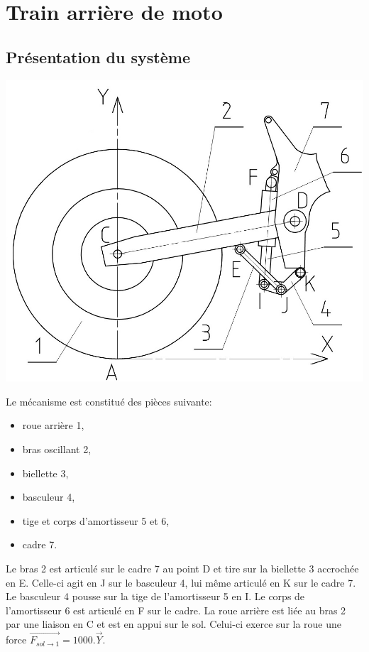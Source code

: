 

\section{Train arrière de moto}

\subsection{Présentation du système}

\begin{minipage}{0.48\linewidth}
 \centering\includegraphics[width=0.5\linewidth]{img/train_arriere_moto}
\end{minipage}
\hfill
\begin{minipage}{0.48\linewidth}
Le mécanisme est constitué des pièces suivante:
\begin{itemize}
\item roue arrière 1,
\item bras oscillant 2,
\item biellette 3,
\item basculeur 4,
\item tige et corps d'amortisseur 5 et 6,
\item cadre 7.
\end{itemize}
\end{minipage}

Le bras 2 est articulé sur le cadre 7 au point D et tire sur la biellette 3 accrochée en E. Celle-ci agit en J sur le basculeur 4, lui même articulé en K sur le cadre 7. Le basculeur 4 pousse sur la tige de l'amortisseur 5 en I. Le corps de l'amortisseur 6 est articulé en F sur le cadre. La roue arrière est liée au bras 2 par une liaison en C et est en appui sur le sol. Celui-ci exerce sur la roue une force $\overrightarrow{F_{sol\rightarrow 1}}=1000.\vec{Y}$.


